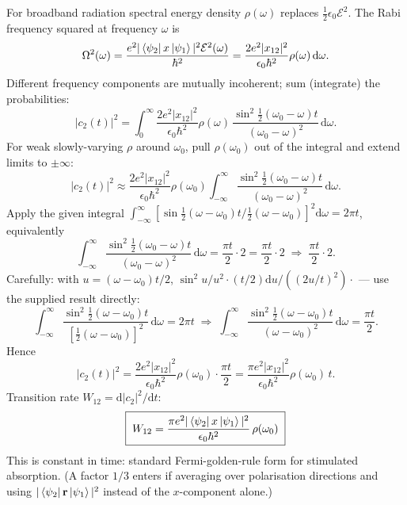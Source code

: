 \documentclass[11pt]{article}
\newcommand{\de}{\mathrm{d}}
\begin{document}
For broadband radiation spectral energy density $\rho(\omega)$ replaces $\tfrac{1}{2}\epsilon_{0}\mathcal{E}^{2}$. The Rabi frequency squared at frequency $\omega$ is
\[
\Omega^{2}(\omega)=\frac{e^{2}|\bra{\psi_{2}}x\ket{\psi_{1}}|^{2}\mathcal{E}^{2}(\omega)}{\hbar^{2}}=\frac{2 e^{2}|x_{12}|^{2}}{\epsilon_{0}\hbar^{2}}\rho(\omega)\,\de\omega.
\]
Different frequency components are mutually incoherent; sum (integrate) the probabilities:
\[
|c_{2}(t)|^{2}=\int_{0}^{\infty}\!\frac{2 e^{2}|x_{12}|^{2}}{\epsilon_{0}\hbar^{2}}\rho(\omega)\,\frac{\sin^{2}\!\tfrac{1}{2}(\omega_{0}-\omega)t}{(\omega_{0}-\omega)^{2}}\,\de\omega.
\]
For weak slowly-varying $\rho$ around $\omega_{0}$, pull $\rho(\omega_{0})$ out of the integral and extend limits to $\pm\infty$:
\[
|c_{2}(t)|^{2}\approx\frac{2 e^{2}|x_{12}|^{2}}{\epsilon_{0}\hbar^{2}}\rho(\omega_{0})\!\int_{-\infty}^{\infty}\!\frac{\sin^{2}\!\tfrac{1}{2}(\omega_{0}-\omega)t}{(\omega_{0}-\omega)^{2}}\,\de\omega.
\]
Apply the given integral $\int_{-\infty}^{\infty}[\sin\tfrac{1}{2}(\omega-\omega_{0})t/\tfrac{1}{2}(\omega-\omega_{0})]^{2}\de\omega=2\pi t$, equivalently
\[
\int_{-\infty}^{\infty}\frac{\sin^{2}\!\tfrac{1}{2}(\omega_{0}-\omega)t}{(\omega_{0}-\omega)^{2}}\,\de\omega=\frac{\pi t}{2}\cdot 2 = \frac{\pi t}{2}\cdot 2\;\Rightarrow\;\frac{\pi t}{2}\cdot 2.
\]
Carefully: with $u=(\omega-\omega_{0})t/2$, $\sin^{2}u/u^{2}\cdot(t/2)\de u/( ( 2u/t)^{2})\cdot$ --- use the supplied result directly:
\[
\int_{-\infty}^{\infty}\!\frac{\sin^{2}\!\tfrac{1}{2}(\omega-\omega_{0})t}{[\tfrac{1}{2}(\omega-\omega_{0})]^{2}}\,\de\omega=2\pi t \;\Rightarrow\;\int_{-\infty}^{\infty}\!\frac{\sin^{2}\!\tfrac{1}{2}(\omega-\omega_{0})t}{(\omega-\omega_{0})^{2}}\,\de\omega=\frac{\pi t}{2}.
\]
Hence
\[
|c_{2}(t)|^{2}=\frac{2 e^{2}|x_{12}|^{2}}{\epsilon_{0}\hbar^{2}}\rho(\omega_{0})\cdot\frac{\pi t}{2}=\frac{\pi e^{2}|x_{12}|^{2}}{\epsilon_{0}\hbar^{2}}\rho(\omega_{0})\,t.
\]
Transition rate $W_{12}=\de|c_{2}|^{2}/\de t$:
\[
\boxed{\;W_{12}=\frac{\pi e^{2}|\bra{\psi_{2}}x\ket{\psi_{1}}|^{2}}{\epsilon_{0}\hbar^{2}}\,\rho(\omega_{0})\;}
\]
This is constant in time: standard Fermi-golden-rule form for stimulated absorption. (A factor $1/3$ enters if averaging over polarisation directions and using $|\bra{\psi_{2}}\vb r\ket{\psi_{1}}|^{2}$ instead of the $x$-component alone.)
\end{document}
